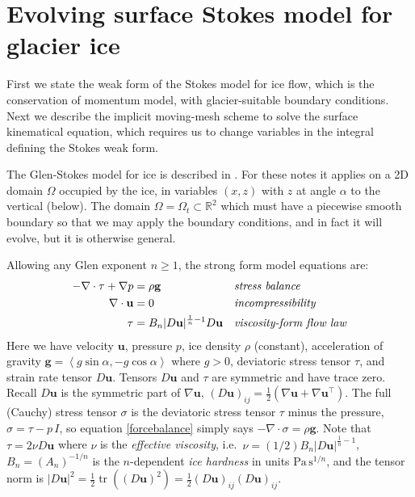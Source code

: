 \documentclass[letterpaper,final,12pt,reqno]{amsart}
\newcommand{\RR}{\mathbb{R}}
\newcommand{\grad}{\nabla}
\newcommand{\Div}{\nabla\cdot}
\newcommand{\trace}{\operatorname{tr}}
\newcommand{\bg}{\mathbf{g}}
\newcommand{\bu}{\mathbf{u}}
\begin{document}
\section{Evolving surface Stokes model for glacier ice}

First we state the weak form of the Stokes model for ice flow, which is the conservation of momentum model, with glacier-suitable boundary conditions.    Next we describe the implicit moving-mesh scheme to solve the surface kinematical equation, which requires us to change variables in the integral defining the Stokes weak form.

The Glen-Stokes model for ice is described in \cite{GreveBlatter2009,JouvetRappaz2011}.  For these notes it applies on a 2D domain $\Omega$ occupied by the ice, in variables $(x,z)$ with $z$ at angle $\alpha$ to the vertical (below).  The domain $\Omega = \Omega_t \subset \RR^2$ which must have a piecewise smooth boundary so that we may apply the boundary conditions, and in fact it will evolve, but it is otherwise general.

Allowing any Glen exponent $n\ge 1$, the strong form model equations are:
\begin{align}
- \nabla \cdot \tau + \nabla p &= \rho \bg &&\text{\emph{stress balance}} \label{forcebalance} \\
\nabla \cdot \bu &= 0 &&\text{\emph{incompressibility}} \label{incompressible} \\
\tau &= B_n |D\bu|^{\frac{1}{n} - 1} D\bu  &&\text{\emph{viscosity-form flow law}} \label{viscflowlaw}
\end{align}
Here we have velocity $\bu$, pressure $p$, ice density $\rho$ (constant), acceleration of gravity $\bg = \left<g\sin\alpha,-g\cos\alpha\right>$ where $g>0$, deviatoric stress tensor $\tau$, and strain rate tensor $D\bu$.  Tensors $D\bu$ and $\tau$ are symmetric and have trace zero.  Recall $D\bu$ is the symmetric part of $\grad \bu$, $(D\bu)_{ij} = \frac{1}{2} \left(\grad\bu + \grad\bu^\top\right)$.  The full (Cauchy) stress tensor $\sigma$ is the deviatoric stress tensor $\tau$ minus the pressure, $\sigma = \tau - p\,I$, so equation \eqref{forcebalance} simply says $-\Div \sigma = \rho \bg$.  Note that $\tau = 2\nu D\bu$ where $\nu$ is the \emph{effective viscosity}, i.e.~$\nu=(1/2)B_n |D\bu|^{\frac{1}{n} - 1}$, $B_n = (A_n)^{-1/n}$ is the $n$-dependent \emph{ice hardness} in units $\text{Pa}\,\text{s}^{1/n}$, and the tensor norm is $|D\bu|^2 = \frac{1}{2} \trace\left((D\bu)^2\right) = \frac{1}{2} (D\bu)_{ij} (D\bu)_{ij}$.
\end{document}
